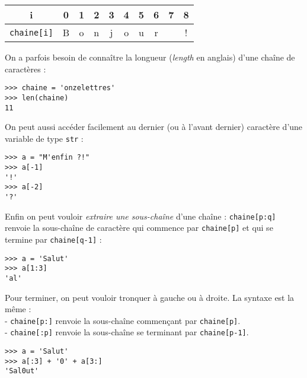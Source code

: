 \begin{center}
    \alternaterowcolors
    \begin{tabular}{|c|c|c|c|c|c|c|c|c|c|}
        \hline
        i                        & 0 & 1 & 2 & 3 & 4 & 5 & 6 & 7 & 8 \\
        \hline
        \texttt{chaine[i]} & B & o & n & j & o & u & r &   & ! \\
        \hline
    \end{tabular}
\end{center}

On a parfois besoin de connaître la longueur (\emph{length} en anglais) d'une chaîne de caractères :

\begin{pys}\begin{verbatim}
>>> chaine = 'onzelettres'
>>> len(chaine)
11
\end{verbatim}
\end{pys}

On peut aussi accéder facilement au dernier (ou à l'avant dernier) caractère d'une variable de type \texttt{str} :

\begin{pys}\begin{verbatim}
>>> a = "M'enfin ?!"
>>> a[-1]
'!'
>>> a[-2]
'?'
\end{verbatim}
\end{pys}

Enfin on peut vouloir \textit{extraire une sous-chaîne} d'une chaîne : \texttt{chaine[p:q]} renvoie la sous-chaîne de caractère qui commence par
\texttt{chaine[p]} et qui se termine par \texttt{chaine[q-1]} :

\begin{pys}\begin{verbatim}
>>> a = 'Salut'
>>> a[1:3]
'al'
\end{verbatim}
\end{pys}

Pour terminer, on peut vouloir tronquer à gauche ou à droite. La syntaxe est la même :\\
- \texttt{chaine[p:]} renvoie la sous-chaîne commençant par \texttt{chaine[p]}.\\
-  \texttt{chaine[:p]} renvoie la sous-chaîne se terminant par \texttt{chaine[p-1]}.

\begin{pys}\begin{verbatim}
>>> a = 'Salut'
>>> a[:3] + '0' + a[3:]
'Sal0ut'
\end{verbatim}
\end{pys}


